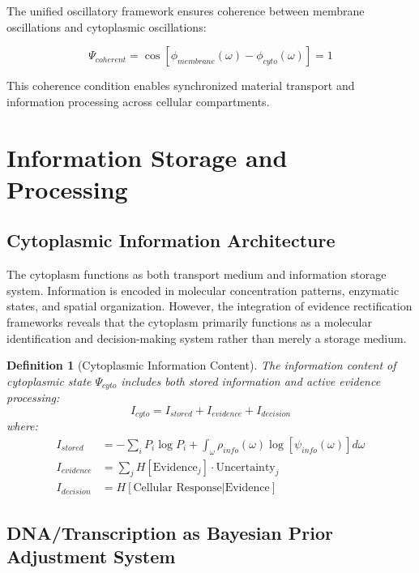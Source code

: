 \documentclass[12pt,a4paper]{article}
\newtheorem{definition}{Definition}
\begin{document}
The unified oscillatory framework ensures coherence between membrane oscillations and cytoplasmic oscillations:

\begin{equation}
\Psi_{coherent} = \cos[\phi_{membrane}(\omega) - \phi_{cyto}(\omega)] = 1
\end{equation}

This coherence condition enables synchronized material transport and information processing across cellular compartments.

\section{Information Storage and Processing}

\subsection{Cytoplasmic Information Architecture}

The cytoplasm functions as both transport medium and information storage system. Information is encoded in molecular concentration patterns, enzymatic states, and spatial organization. However, the integration of evidence rectification frameworks reveals that the cytoplasm primarily functions as a molecular identification and decision-making system rather than merely a storage medium.

\begin{definition}[Cytoplasmic Information Content]
The information content of cytoplasmic state $\Psi_{cyto}$ includes both stored information and active evidence processing:
\begin{equation}
I_{cyto} = I_{stored} + I_{evidence} + I_{decision}
\end{equation}
where:
\begin{align}
I_{stored} &= -\sum_i P_i \log P_i + \int_{\omega} \rho_{info}(\omega) \log[\psi_{info}(\omega)] d\omega \\
I_{evidence} &= \sum_j H[\text{Evidence}_j] \cdot \text{Uncertainty}_j \\
I_{decision} &= H[\text{Cellular Response} | \text{Evidence}]
\end{align}
\end{definition}

\subsection{DNA/Transcription as Bayesian Prior Adjustment System}
\end{document}
